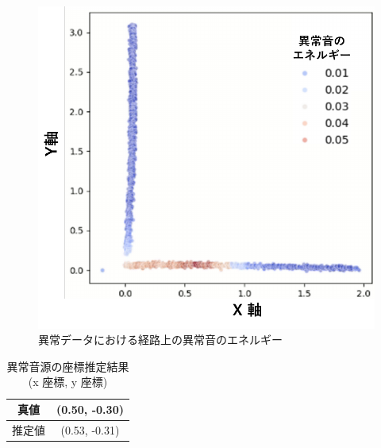 \documentclass[../main]{subfiles}
\begin{document}
\begin{figure}[tb]
  \centering
  \includegraphics[keepaspectratio, width=0.8\linewidth]{energy_abnormal.pdf}
  \caption{異常データにおける経路上の異常音のエネルギー}
\end{figure}

\begin{table}[h]
  \centering
  \begin{tabular}{|c|c|}
  \hline
  真値 & (0.50, -0.30) \\ \hline
  推定値 & (0.53, -0.31) \\ \hline
  \end{tabular}
  \caption{異常音源の座標推定結果 (x 座標, y 座標)}
  \label{tab:result}
\end{table}
\end{document}
